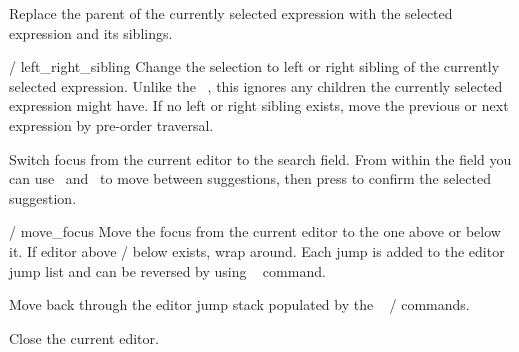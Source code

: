 Replace the parent of the currently selected expression with the selected
expression and its siblings. 

	{ / }{left_right_sibling}
Change the selection to left or right sibling of the currently selected
expression. Unlike the \ak{^}~, this ignores any children the
currently selected expression might have. If no left or right sibling
exists, move the previous or next expression by pre-order traversal.

Switch focus from the current editor to the  search
field. From within the field you can use~\ak{^} and~ to move between
suggestions, then press \keys{\return} to confirm the selected suggestion.

	{ / }{move_focus}
Move the focus from the current editor to the one above or below it. If
editor above / below exists, wrap around. Each jump is added to the
editor jump list and can be reversed by using
\hyperref[cmd:jump_back]{}~ command.

Move back through the editor jump stack populated by the
\hyperref[cmd:move_focus]{}~
 /  commands.

Close the current editor.
